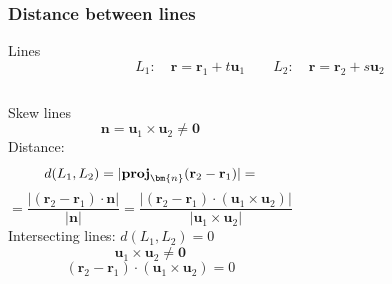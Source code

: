 \begin{frame}
  \frametitle{Distance between lines}
     Lines
    $$L_1: \quad \textbf{r}= \textbf{r}_1+t\textbf{u}_1 \qquad L_2: \quad \textbf{r}= \textbf{r}_2+s\textbf{u}_2$$

   \begin{columns}[t]
    \column[T]{6cm}
    \textcolor[rgb]{0.98,0.00,0.00}{Skew lines}
    $$\textbf{n} = \textbf{u}_1 \times \textbf{u}_2 \neq \textbf{0}$$
    \textcolor[rgb]{0.98,0.00,0.00}{Distance}:
    $$
      d(L_1,L_2)  = |\textbf{\text{proj}}_{\bm{n}} (\textbf{r}_2-\textbf{r}_1)| =$$
      $$= \boxed{\frac{|(\textbf{r}_2-\textbf{r}_1)\cdot \textbf{n}|}{|\textbf{n}|}}=
      \frac{|(\textbf{r}_2-\textbf{r}_1)\cdot (\textbf{u}_1\times \textbf{u}_2)|}{|\textbf{u}_1\times \textbf{u}_2|}$$
    \textcolor[rgb]{0.98,0.00,0.00}{Intersecting} lines: $d(L_1,L_2)=0$
    $$\textbf{u}_1\times \textbf{u}_2 \neq \textbf{0}$$
    $$(\textbf{r}_2-\textbf{r}_1) \cdot (\textbf{u}_1\times \textbf{u}_2) = 0$$

    \column{6.5cm}
  \end{columns}
\end{frame}



